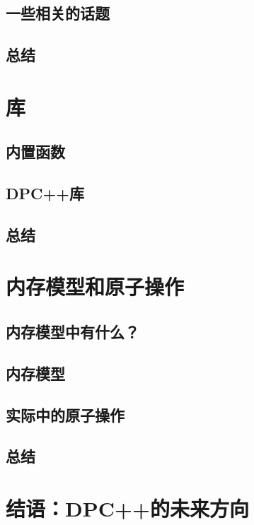 \documentclass[11pt,a4paper,UTF8]{ctexart}
\begin{document}
		\subsection{一些相关的话题}
		
		\subsection{总结}
		
	\section{库}
	
		\subsection{内置函数}
		
		\subsection{DPC++库}
		
		\subsection{总结}
		
	\section{内存模型和原子操作}
	
		\subsection{内存模型中有什么？}
		
		\subsection{内存模型}
		
		\subsection{实际中的原子操作}
		
		\subsection{总结}
		
	\section{结语：DPC++的未来方向}
	
\end{document}
